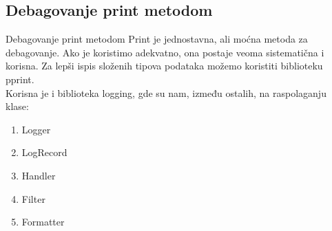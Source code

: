 \documentclass{beamer}
\begin{document}
\subsection{Debagovanje print metodom}
\begin{frame}{Debagovanje print metodom}
Print je jednostavna, ali moćna metoda za debagovanje. Ako je koristimo adekvatno, ona postaje veoma sistematična i korisna. Za lepši ispis složenih tipova podataka možemo koristiti biblioteku pprint. \\
Korisna je i biblioteka logging, gde su nam, između ostalih, na raspolaganju klase:
\begin{enumerate}
    \item Logger
    \item LogRecord
    \item Handler
    \item Filter
    \item Formatter
\end{enumerate}  
\end{frame}

\end{document}
